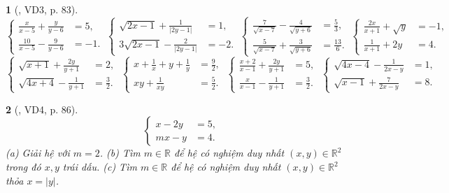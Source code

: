 \documentclass{article}
\newtheorem{baitoan}{}
\begin{document}
\begin{baitoan}[\cite{Kien_dai_so_9}, VD3, p. 83]
	\begin{equation*}
		\left\{\begin{split}
			\frac{x}{x - 5} + \frac{y}{y - 6} &= 5,\\
			\frac{10}{x - 5} - \frac{9}{y - 6} &= -1.
		\end{split}\right.\ \left\{\begin{split}
			\sqrt{2x - 1} + \frac{1}{|2y - 1|} &= 1,\\
			3\sqrt{2x - 1} - \frac{2}{|2y - 1|} &= -2.
		\end{split}\right.\ \left\{\begin{split}
			\frac{7}{\sqrt{x - 7}} - \frac{4}{\sqrt{y + 6}} &= \frac{5}{3},\\
			\frac{5}{\sqrt{x - 7}} + \frac{3}{\sqrt{y + 6}} &= \frac{13}{6}.
		\end{split}\right.\ \left\{\begin{split}
			\frac{2x}{x + 1} + \sqrt{y} &= -1,\\
			\frac{1}{x + 1} + 2y &= 4.
		\end{split}\right.
	\end{equation*}
	\begin{equation*}
		\left\{\begin{split}
			\sqrt{x + 1} + \frac{2y}{y + 1} &= 2,\\
			\sqrt{4x + 4} - \frac{1}{y + 1} &= \frac{3}{2}.
		\end{split}\right.\ \left\{\begin{split}
			x + \frac{1}{x} + y + \frac{1}{y} &= \frac{9}{2},\\
			xy + \frac{1}{xy} &= \frac{5}{2}.
		\end{split}\right.\ \left\{\begin{split}
			\frac{x + 2}{x - 1} + \frac{2y}{y + 1} &= 5,\\
			\frac{x}{x - 1} - \frac{1}{y + 1} &= \frac{3}{2}.
		\end{split}\right.\ \left\{\begin{split}
			\sqrt{4x - 4} - \frac{1}{2x - y} &= 1,\\
			\sqrt{x - 1} + \frac{7}{2x - y} &= 8.
		\end{split}\right.
	\end{equation*}	
	
\end{baitoan}

\begin{baitoan}[\cite{Kien_dai_so_9}, VD4, p. 86]
	\begin{equation*}
		\left\{\begin{split}
			x - 2y &= 5,\\
			mx - y &= 4.
		\end{split}\right.
	\end{equation*}
	(a) Giải hệ với $m = 2$. (b) Tìm $m\in\mathbb{R}$ để hệ có nghiệm duy nhất $(x,y)\in\mathbb{R}^2$ trong đó $x,y$ trái dấu. (c) Tìm $m\in\mathbb{R}$ để hệ có nghiệm duy nhất $(x,y)\in\mathbb{R}^2$ thỏa $x = |y|$.
\end{baitoan}
\end{document}
